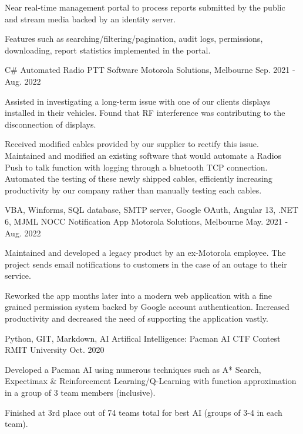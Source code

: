 \begin{cventries}
{\begin{cvitems}
        \item {Near real-time management portal to process reports submitted by the public and stream media backed by an identity server.}
        \item {Features such as searching/filtering/pagination, audit logs, permissions, downloading, report statistics implemented in the portal.}
      \end{cvitems}
    }
  \cventry
    {C\#}
    {Automated Radio PTT Software}
    {Motorola Solutions, Melbourne}
    {Sep. 2021 - Aug. 2022}
    {
      \begin{cvitems}
        \item {Assisted in investigating a long-term issue with one of our clients displays installed in their vehicles. Found that RF interference was contributing to the disconnection of displays.}
        \item {Received modified cables provided by our supplier to rectify this issue. Maintained and modified an existing software that would automate a Radios Push to talk function with logging through a bluetooth TCP connection. Automated the testing of these newly shipped cables, efficiently increasing productivity by our company rather than manually testing each cables.}
      \end{cvitems}
    }
  \cventry
    {VBA, Winforms, SQL database, SMTP server, Google OAuth, Angular 13, .NET 6, MJML}
    {NOCC Notification App}
    {Motorola Solutions, Melbourne}
    {May. 2021 - Aug. 2022}
    {
      \begin{cvitems}
        \item {Maintained and developed a legacy product by an ex-Motorola employee. The project sends email notifications to customers in the case of an outage to their service.}
        \item {Reworked the app months later into a modern web application with a fine grained permission system backed by Google account authentication. Increased productivity and decreased the need of supporting the application vastly.}
      \end{cvitems}
    }
  \cventry
    {Python, GIT, Markdown, AI}
    {Artifical Intelligence: Pacman AI CTF Contest}
    {RMIT University}
    {Oct. 2020}
    {
      \begin{cvitems}
        \item {Developed a Pacman AI using numerous techniques such as A* Search, Expectimax \& Reinforcement Learning/Q-Learning with function approximation in a group of 3 team members (inclusive).}
        \item {Finished at 3rd place out of 74 teams total for best AI (groups of 3-4 in each team).}
      \end{cvitems}
    }
\end{cventries}
